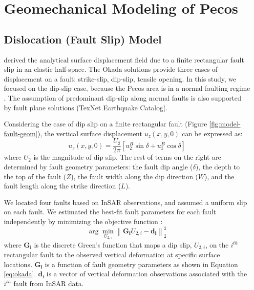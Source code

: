 
\chapter{Geomechanical Modeling of Pecos}


\section{Dislocation (Fault Slip) Model}
\label{appen:okada}
\cite{Okada1992InternalDeformationDue} derived the analytical surface displacement field due to a finite rectangular fault slip in an elastic half-space. The Okada solutions provide three cases of displacement on a fault: strike-slip, dip-slip, tensile opening. In this study, we focused on the dip-slip case, because the Pecos area is in a normal faulting regime \citep{LundSnee2018StateStressPermian}.  The assumption of predominant dip-slip along normal faults is also supported by fault plane solutions (TexNet Earthquake Catalog). 

Considering the case of dip slip on a finite rectangular fault (Figure \ref{fig:model-fault-geom}), the vertical surface displacement $u_z(x, y, 0)$ can be expressed as:
\begin{equation}
	u_{z}(x,y,0)=\frac{U_{2}}{2\pi }[u_{2}^{B}\sin \delta + u_{3}^{B}\cos \delta]
	\label{eq:okada}
\end{equation}
where $U_2$ is the magnitude of dip slip. The rest of terms on the right are determined by fault geometry parameters: the fault dip angle ($\delta$), the depth to the top of the fault ($Z$), the fault width along the dip direction ($W$), and the fault length along the strike direction ($L$). 

We located four faults based on InSAR observations, and assumed a uniform slip on each fault. We estimated the best-fit fault parameters for each fault independently by minimizing the objective function \citep{Du1992ComparisonVariousInversion}:
\begin{equation}
	\arg \min_{U_{2,i}} \left \| \mathbf{G_i}U_{2,i}-\mathbf{d_i} \right \|^2_{2}  
	\label{eq:model-obj-1}
\end{equation}	  	
where $\mathbf{G_i}$ is the discrete Green’s function that maps a dip slip, $U_{2,i}$, on the $i^{th}$ rectangular fault to the observed vertical deformation at specific surface locations.  $\mathbf{G_i}$ is a function of fault geometry parameters as shown in Equation \eqref{eq:okada}. $\mathbf{d_i}$ is a vector of vertical deformation observations associated with the $i^{th}$ fault from InSAR data.

